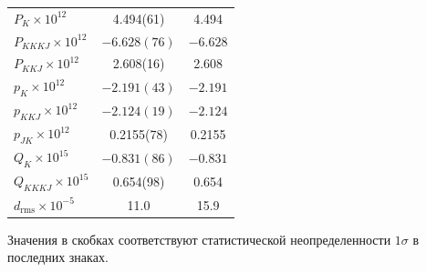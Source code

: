 \begin{table}[htbp]
\begin{tabular}{l c c}
$P_K\times10^{12}$ & 4.494(61) & 4.494 \\
$P_{KKKJ}\times10^{12}$ & $-6.628(76)$ & $-6.628$ \\
$P_{KKJ}\times10^{12}$ & 2.608(16) & 2.608 \\
$p_K\times10^{12}$ & $-2.191(43)$ & $-2.191$ \\
$p_{KKJ}\times10^{12}$ & $-2.124(19)$ & $-2.124$ \\
$p_{JK}\times10^{12}$ & 0.2155(78) & 0.2155 \\
$Q_K\times10^{15}$ & $-0.831(86)$ & $-0.831$ \\
$Q_{KKKJ}\times10^{15}$ & 0.654(98) & 0.654 \\
$d_{\textrm{rms}}\times10^{-5}$ & 11.0 & 15.9 \\
\hline
\end{tabular}
\par\vspace{1mm}
\footnotesize Значения в скобках соответствуют статистической неопределенности $1\sigma$ в последних знаках.
\end{table}
